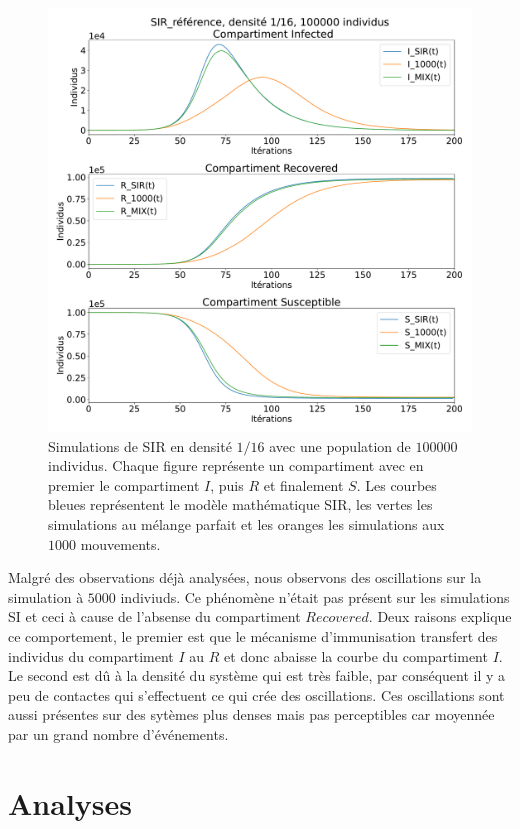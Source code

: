 \newpage

\begin{figure}[h]
	\centering
	\captionsetup{justification=centering}
	\includegraphics[width=.9\textwidth]{Images/SIR_ref_16_100.pdf}
	\caption[Simulation SIR, densité $1/16$]{Simulations de SIR en densité $1/16$ avec une population de $100000$ individus. Chaque figure représente un compartiment avec en premier le compartiment $I$, puis $R$ et finalement $S$. Les courbes bleues représentent le modèle mathématique SIR, les vertes les simulations au mélange parfait et les oranges les simulations aux $1000$ mouvements.}
\end{figure}

Malgré des observations déjà analysées, nous observons des oscillations sur la simulation à $5000$ indiviuds. Ce phénomène n'était pas présent sur les simulations SI et ceci à cause de l'absense du compartiment $Recovered$. Deux raisons explique ce comportement, le premier est que le mécanisme d'immunisation transfert des individus du compartiment $I$ au $R$ et donc abaisse la courbe du compartiment $I$. Le second est dû à la densité du système qui est très faible, par conséquent il y a peu de contactes qui s'effectuent ce qui crée des oscillations. Ces oscillations sont aussi présentes sur des sytèmes plus denses mais pas perceptibles car moyennée par un grand nombre d'événements.

\section{Analyses}

